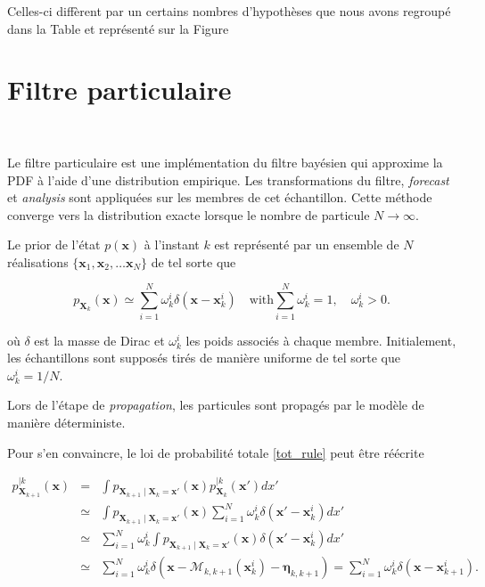 Celles-ci diffèrent par un certains nombres d'hypothèses que nous avons regroupé dans la Table et représenté sur la Figure


\section{Filtre particulaire}~\label{sec:filtre_particulaire}

Le filtre particulaire est une implémentation du filtre bayésien qui approxime la PDF à l'aide d'une distribution empirique. Les transformations du filtre, \textit{forecast} et \textit{analysis} sont appliquées sur les membres de cet échantillon.
Cette méthode converge vers la distribution exacte lorsque le nombre de particule $N \to \infty$.

Le prior de l'état $p(\bm x)$ à l'instant $k$ est représenté par un ensemble de $N$ réalisations $\{\bm x_1, \bm x_2, \dots \bm x_N\}$ de tel sorte que

\begin{equation*}
    p_{\bm X_k}(\bm x) \simeq \sum_{i=1}^N \omega^i_k \delta(\bm x - \bm x_k^i) \quad \text{with} \sum_{i=1}^N \omega^i_k = 1, \quad \omega^i_k > 0.
\end{equation*}

où $\delta$ est la masse de Dirac et $\omega^i_k$ les poids associés à chaque membre. Initialement, les échantillons sont supposés tirés de manière uniforme de tel sorte que $\omega^i_k = 1/N$.

Lors de l'étape de \textit{propagation}, les particules sont propagés par le modèle de manière déterministe.

Pour s'en convaincre, le loi de probabilité totale \ref{tot_rule} peut être réécrite

\begin{eqnarray*}
    p_{\bm X_{k+1}}^{\mid k}(\bm x) &=& \int p_{\bm X_{k+1}\mid \bm X_{k} = \bm x'}(\bm x) p_{\bm X_{k}}^{\mid k}(\bm x')dx' \\
    &\simeq& \int p_{\bm X_{k+1}\mid \bm X_{k} = \bm x'}(\bm x) \sum_{i=1}^N \omega^i_k \delta(\bm x' - \bm x_k^i) dx' \\
    &\simeq& \sum_{i=1}^N \omega^i_k  \int p_{\bm X_{k+1}\mid \bm X_{k} = \bm x'}(\bm x) \delta(\bm x' - \bm x_k^i) dx' \\
    &\simeq& \sum_{i=1}^N \omega^i_k \delta(\bm x - \mathcal M_{k,k+1}(\bm x_k^i) - \bm \eta_{k,k+1}) = \sum_{i=1}^N \omega^i_k \delta(\bm x - \bm x_{k+1}^i).
\end{eqnarray*}

